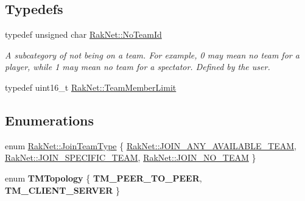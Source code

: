 \subsection*{Typedefs}
\begin{DoxyCompactItemize}
\item 
\hypertarget{group___t_e_a_m___m_a_n_a_g_e_r___g_r_o_u_p_gadd1e99b7724ceb0f6794f46de31a6b02}{typedef unsigned char \hyperlink{group___t_e_a_m___m_a_n_a_g_e_r___g_r_o_u_p_gadd1e99b7724ceb0f6794f46de31a6b02}{Rak\-Net\-::\-No\-Team\-Id}}\label{group___t_e_a_m___m_a_n_a_g_e_r___g_r_o_u_p_gadd1e99b7724ceb0f6794f46de31a6b02}

\begin{DoxyCompactList}\small\item\em A subcategory of not being on a team. For example, 0 may mean no team for a player, while 1 may mean no team for a spectator. Defined by the user. \end{DoxyCompactList}\item 
typedef uint16\-\_\-t \hyperlink{group___t_e_a_m___m_a_n_a_g_e_r___g_r_o_u_p_ga236290d3c5e0d6b3b4559ba851f02bed}{Rak\-Net\-::\-Team\-Member\-Limit}
\end{DoxyCompactItemize}
\subsection*{Enumerations}
\begin{DoxyCompactItemize}
\item 
enum \hyperlink{group___t_e_a_m___m_a_n_a_g_e_r___g_r_o_u_p_ga8a8704b992ae17ee4789b2ba4cc4b34b}{Rak\-Net\-::\-Join\-Team\-Type} \{ \hyperlink{group___t_e_a_m___m_a_n_a_g_e_r___g_r_o_u_p_gga8a8704b992ae17ee4789b2ba4cc4b34ba6edb2bdfc2a37d3db8dd862c92d0b316}{Rak\-Net\-::\-J\-O\-I\-N\-\_\-\-A\-N\-Y\-\_\-\-A\-V\-A\-I\-L\-A\-B\-L\-E\-\_\-\-T\-E\-A\-M}, 
\hyperlink{group___t_e_a_m___m_a_n_a_g_e_r___g_r_o_u_p_gga8a8704b992ae17ee4789b2ba4cc4b34ba4711c36301a77fa9a6f6783487fc451f}{Rak\-Net\-::\-J\-O\-I\-N\-\_\-\-S\-P\-E\-C\-I\-F\-I\-C\-\_\-\-T\-E\-A\-M}, 
\hyperlink{group___t_e_a_m___m_a_n_a_g_e_r___g_r_o_u_p_gga8a8704b992ae17ee4789b2ba4cc4b34bac7bae805f1fae12f6827f644bfd8e292}{Rak\-Net\-::\-J\-O\-I\-N\-\_\-\-N\-O\-\_\-\-T\-E\-A\-M}
 \}
\item 
enum {\bfseries T\-M\-Topology} \{ {\bfseries T\-M\-\_\-\-P\-E\-E\-R\-\_\-\-T\-O\-\_\-\-P\-E\-E\-R}, 
{\bfseries T\-M\-\_\-\-C\-L\-I\-E\-N\-T\-\_\-\-S\-E\-R\-V\-E\-R}
 \}
\end{DoxyCompactItemize}


